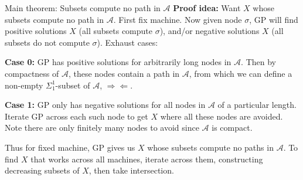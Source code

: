 \begin{frame}{Main theorem: Subsets compute no path in $\mathcal{A}$}
  \textbf{Proof idea:} Want $X$ whose subsets compute no path in 
  $\mathcal{A}$. First fix machine. Now given node $\sigma$, GP will
  find positive solutions $X$ (all subsets compute $\sigma$), and/or
  negative solutions $X$ (all subsets do not compute $\sigma$). Exhaust
  cases:

  \vspace{1em}
  \textbf{Case 0:} GP has positive solutions for arbitrarily long nodes in
  $\mathcal{A}$. Then by compactness of $\mathcal{A}$, these nodes contain
  a path in $\mathcal{A}$, from which we can define a non-empty
  $\Sigma_1^1$-subset of $\mathcal{A}$, $\Rightarrow\Leftarrow$.

  \vspace{0.5em}
  \textbf{Case 1:} GP only has negative solutions for all nodes in
  $\mathcal{A}$ of a particular length. Iterate GP across each such node to
  get $X$ where all these nodes are avoided. Note there are only finitely
  many nodes to avoid since $\mathcal{A}$ is compact.


  \vspace{1em}
  Thus for fixed machine, GP gives us $X$ whose subsets compute no paths in
  $\mathcal{A}$. To find $X$ that works across all machines, iterate across
  them, constructing decreasing subsets of $X$, then take intersection.
\end{frame}

